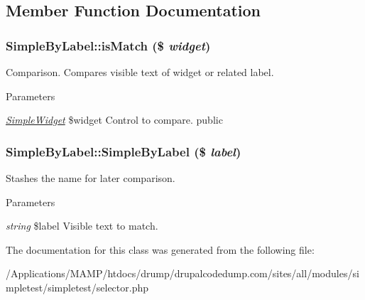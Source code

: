\subsection{Member Function Documentation}
\hypertarget{class_simple_by_label_ad8a7657dd1c94a5e642e01810308bce4}{
\subsubsection[{isMatch}]{\setlength{\rightskip}{0pt plus 5cm}SimpleByLabel::isMatch (\$ {\em widget})}}
\label{class_simple_by_label_ad8a7657dd1c94a5e642e01810308bce4}
Comparison. Compares visible text of widget or related label. 
\begin{DoxyParams}{Parameters}
\item[{\em \hyperlink{class_simple_widget}{SimpleWidget}}]\$widget Control to compare.  public \end{DoxyParams}
\hypertarget{class_simple_by_label_aaefd319810b89b2bc21a6831875cb547}{
\subsubsection[{SimpleByLabel}]{\setlength{\rightskip}{0pt plus 5cm}SimpleByLabel::SimpleByLabel (\$ {\em label})}}
\label{class_simple_by_label_aaefd319810b89b2bc21a6831875cb547}
Stashes the name for later comparison. 
\begin{DoxyParams}{Parameters}
\item[{\em string}]\$label Visible text to match. \end{DoxyParams}


The documentation for this class was generated from the following file:\begin{DoxyCompactItemize}
\item 
/Applications/MAMP/htdocs/drump/drupalcodedump.com/sites/all/modules/simpletest/simpletest/selector.php\end{DoxyCompactItemize}
